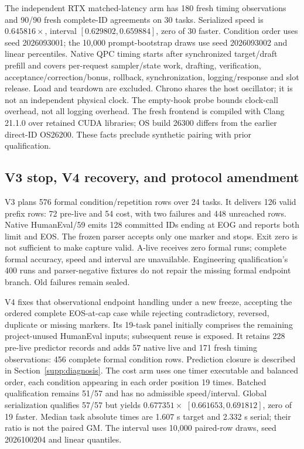 The independent RTX matched-latency arm has 180 fresh timing observations and 90/90 fresh complete-ID agreements on 30 tasks. Serialized speed is $0.645816\times$, interval $[0.629802,0.659884]$, zero of 30 faster. Condition order uses seed 2026093001; the 10,000 prompt-bootstrap draws use seed 2026093002 and linear percentiles. Native QPC timing starts after synchronized target/draft prefill and covers per-request sampler/state work, drafting, verification, acceptance/correction/bonus, rollback, synchronization, logging/response and slot release. Load and teardown are excluded. Chrono shares the host oscillator; it is not an independent physical clock. The empty-hook probe bounds clock-call overhead, not all logging overhead. The fresh frontend is compiled with Clang 21.1.0 over retained CUDA libraries; OS build 26300 differs from the earlier direct-ID OS26200. These facts preclude synthetic pairing with prior qualification.

\subsection{V3 stop, V4 recovery, and protocol amendment}
V3 plans 576 formal condition/repetition rows over 24 tasks. It delivers 126 valid prefix rows: 72 pre-live and 54 cost, with two failures and 448 unreached rows. Native HumanEval/59 emits 128 committed IDs ending at EOG and reports both limit and EOS. The frozen parser accepts only one marker and stops. Exit zero is not sufficient to make capture valid. A-live receives zero formal runs; complete formal accuracy, speed and interval are unavailable. Engineering qualification's 400 runs and parser-negative fixtures do not repair the missing formal endpoint branch. Old failures remain sealed.

V4 fixes that observational endpoint handling under a new freeze, accepting the ordered complete EOS-at-cap case while rejecting contradictory, reversed, duplicate or missing markers. Its 19-task panel initially comprises the remaining project-unused HumanEval inputs; subsequent reuse is exposed. It retains 228 pre-live predictor records and adds 57 native live and 171 fresh timing observations: 456 complete formal condition rows. Prediction closure is described in Section~\ref{supp:diagnosis}. The cost arm uses one timer executable and balanced order, each condition appearing in each order position 19 times. Batched qualification remains 51/57 and has no admissible speed/interval. Global serialization qualifies 57/57 but yields $0.677351\times$ $[0.661653,0.691812]$, zero of 19 faster. Median task absolute times are 1.607 s target and 2.332 s serial; their ratio is not the paired GM. The interval uses 10,000 paired-row draws, seed 2026100204 and linear quantiles.

